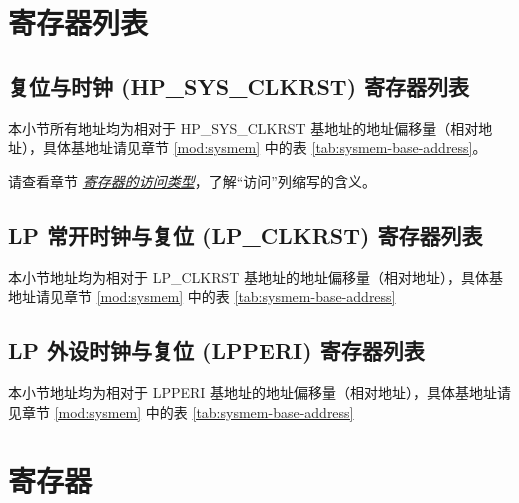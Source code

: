 \documentclass[main\_\_CN.tex]{subfiles}
\begin{document}


\newpage
\hypertarget{resclk-reg-summ}{}
\section{寄存器列表}
\label{sec:resclk-reg-summ}

\subsection{复位与时钟 (HP\_SYS\_CLKRST) 寄存器列表}
本小节所有地址均为相对于 HP\_SYS\_CLKRST 基地址的地址偏移量（相对地址），具体基地址请见章节 \ref{mod:sysmem} \textit{} 中的表 \ref{tab:sysmem-base-address}。

请查看章节 \hyperref[glossary-access-types]{\textit{寄存器的访问类型}}，了解“访问”列缩写的含义。



\subsection{LP 常开时钟与复位 (LP\_CLKRST) 寄存器列表}
本小节地址均为相对于 LP\_CLKRST 基地址的地址偏移量（相对地址），具体基地址请见章节 \ref{mod:sysmem} \textit{} 中的表 \ref{tab:sysmem-base-address}



\subsection{LP 外设时钟与复位 (LPPERI) 寄存器列表}
本小节地址均为相对于 LPPERI 基地址的地址偏移量（相对地址），具体基地址请见章节 \ref{mod:sysmem} \textit{} 中的表 \ref{tab:sysmem-base-address}






\newpage

\section{寄存器}
\end{document}
